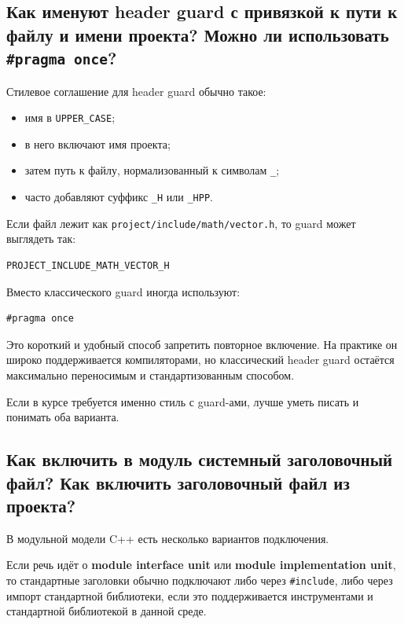 \subsection{Как именуют header guard с привязкой к пути к файлу и имени проекта? Можно ли использовать \texttt{\#pragma once}?}
Стилевое соглашение для header guard обычно такое:
\begin{itemize}
    \item имя в \texttt{UPPER\_CASE};
    \item в него включают имя проекта;
    \item затем путь к файлу, нормализованный к символам \texttt{\_};
    \item часто добавляют суффикс \texttt{\_H} или \texttt{\_HPP}.
\end{itemize}

\begin{example}
Если файл лежит как \texttt{project/include/math/vector.h}, то guard может выглядеть так:
\begin{verbatim}
PROJECT_INCLUDE_MATH_VECTOR_H
\end{verbatim}
\end{example}

Вместо классического guard иногда используют:
\begin{verbatim}
#pragma once
\end{verbatim}

Это короткий и удобный способ запретить повторное включение. На практике он широко поддерживается компиляторами, но классический header guard остаётся максимально переносимым и стандартизованным способом.

\begin{remark}
Если в курсе требуется именно стиль с guard-ами, лучше уметь писать и понимать оба варианта.
\end{remark}

\subsection{Как включить в модуль системный заголовочный файл? Как включить заголовочный файл из проекта?}
В модульной модели C++ есть несколько вариантов подключения.

Если речь идёт о \textbf{module interface unit} или \textbf{module implementation unit}, то стандартные заголовки обычно подключают либо через \texttt{\#include}, либо через импорт стандартной библиотеки, если это поддерживается инструментами и стандартной библиотекой в данной среде.

